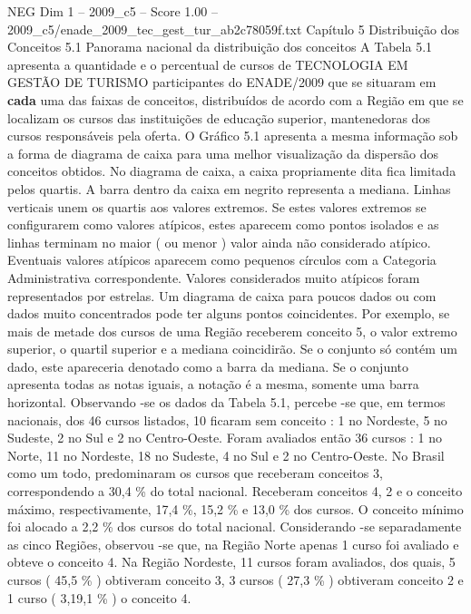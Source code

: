 \begin{textsample}{NEG Dim 1 – 2009\_c5 – Score 1.00 – 2009\_c5/enade\_2009\_tec\_gest\_tur\_ab2c78059f.txt}  \label{ex:f1_neg_298}
Capítulo 5 Distribuição dos Conceitos 5.1 Panorama nacional da distribuição dos conceitos A Tabela 5.1 apresenta a quantidade e o percentual de cursos de TECNOLOGIA EM GESTÃO DE TURISMO participantes do ENADE/2009 que se situaram em \textbf{cada} uma das faixas de conceitos, distribuídos de acordo com a Região em que se localizam os cursos das instituições de educação superior, mantenedoras dos cursos responsáveis pela oferta.
O Gráfico 5.1 apresenta a mesma informação sob a forma de diagrama de caixa para uma melhor visualização da dispersão dos conceitos obtidos.
No diagrama de caixa, a caixa propriamente dita fica limitada pelos quartis.
A barra dentro da caixa em negrito representa a mediana.
Linhas verticais unem os quartis aos valores extremos.
Se estes valores extremos se configurarem como valores atípicos, estes aparecem como pontos isolados e as linhas terminam no maior ( ou menor ) valor ainda não considerado atípico.
Eventuais valores atípicos aparecem como pequenos círculos com a Categoria Administrativa correspondente.
Valores considerados muito atípicos foram representados por estrelas.
Um diagrama de caixa para poucos dados ou com dados muito concentrados pode ter alguns pontos coincidentes.
Por exemplo, se mais de metade dos cursos de uma Região receberem conceito 5, o valor extremo superior, o quartil superior e a mediana coincidirão.
Se o conjunto só contém um dado, este apareceria denotado como a barra da mediana.
Se o conjunto apresenta todas as notas iguais, a notação é a mesma, somente uma barra horizontal.
Observando -se os dados da Tabela 5.1, percebe -se que, em termos nacionais, dos 46 cursos listados, 10 ficaram sem conceito : 1 no Nordeste, 5 no Sudeste, 2 no Sul e 2 no Centro-Oeste.
Foram avaliados então 36 cursos : 1 no Norte, 11 no Nordeste, 18 no Sudeste, 4 no Sul e 2 no Centro-Oeste.
No Brasil como um todo, predominaram os cursos que receberam conceitos 3, correspondendo a 30,4 \% do total nacional.
Receberam conceitos 4, 2 e o conceito máximo, respectivamente, 17,4 \%, 15,2 \% e 13,0 \% dos cursos.
O conceito mínimo foi alocado a 2,2 \% dos cursos do total nacional.
Considerando -se separadamente as cinco Regiões, observou -se que, na Região Norte apenas 1 curso foi avaliado e obteve o conceito 4.
Na Região Nordeste, 11 cursos foram avaliados, dos quais, 5 cursos ( 45,5 \% ) obtiveram conceito 3, 3 cursos ( 27,3 \% ) obtiveram conceito 2 e 1 curso ( 3,19,1 \% ) o conceito 4.

\end{textsample}
